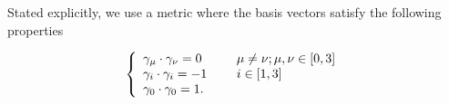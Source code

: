 Stated explicitly, we use a metric where the basis vectors satisfy the following properties

\begin{dmath}\label{eqn:prerequisites:420}
\left\{
\begin{array}{l l}
\gamma_\mu \cdot \gamma_\nu = 0 & \quad \mbox{ \( \mu \ne \nu ; \mu, \nu \in [0,3] \) } \\
\gamma_i \cdot \gamma_i = -1& \quad \mbox{ \( i \in [1,3] \) } \\
\gamma_0 \cdot \gamma_0 = 1. &\\
\end{array}
\right.
\end{dmath}


